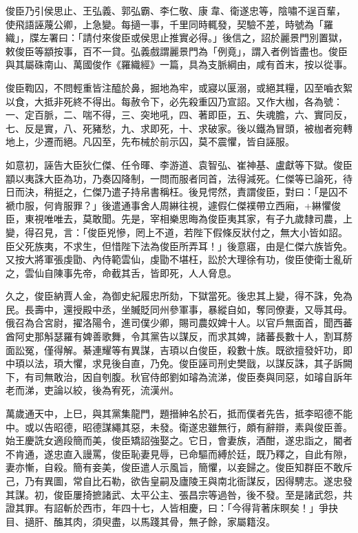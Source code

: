 \begin{pinyinscope}
 俊臣乃引侯思止、王弘義、郭弘霸、李仁敬、康韋、衛遂忠等，陰嘯不逞百輩，使飛語誣蔑公卿，上急變。每擿一事，千里同時輒發，契驗不差，時號為「羅織」，牒左署曰：「請付來俊臣或侯思止推實必得。」後信之，詔於麗景門別置獄，敕俊臣等顓按事，百不一貸。弘義戲謂麗景門為「例竟」，謂入者例皆盡也。俊臣與其屬硃南山、萬國俊作《羅織經》一篇，具為支脈綱由，咸有首末，按以從事。



 俊臣鞫囚，不問輕重皆注醯於鼻，掘地為牢，或寢以匽溺，或絕其糧，囚至嚙衣絮以食，大抵非死終不得出。每赦令下，必先殺重囚乃宣詔。又作大枷，各為號：一、定百脈，二、喘不得，三、突地吼，四、著即臣，五、失魂膽，六、實同反，七、反是實，八、死豬愁，九、求即死，十、求破家。後以鐵為冒頭，被枷者宛轉地上，少遷而絕。凡囚至，先布械於前示囚，莫不震懼，皆自誣服。



 如意初，誣告大臣狄仁傑、任令暉、李游道、袁智弘、崔神基、盧獻等下獄。俊臣顓以夷誅大臣為功，乃奏囚降制，一問而服者同首，法得減死。仁傑等已論死，待日而決，稍挺之，仁傑乃遣子持帛書稱枉。後見愕然，責謂俊臣，對曰：「是囚不褫巾服，何肯服罪？」後遣通事舍人周綝往視，遽假仁傑襆帶立西廂，+綝懼俊臣，東視唯唯去，莫敢聞。先是，宰相樂思晦為俊臣夷其家，有子九歲隸司農，上變，得召見，言：「俊臣兇慘，罔上不道，若陛下假條反狀付之，無大小皆如詔。臣父死族夷，不求生，但惜陛下法為俊臣所弄耳！」後意寤，由是仁傑六族皆免。又按大將軍張虔勖、內侍範雲仙，虔勖不堪枉，訟於大理徐有功，俊臣使衛士亂斫之，雲仙自陳事先帝，命截其舌，皆即死，人人脅息。



 久之，俊臣納賈人金，為御史紀履忠所劾，下獄當死。後忠其上變，得不誅，免為民。長壽中，還授殿中丞，坐贓貶同州參軍事，暴縱自如，奪同僚妻，又辱其母。俄召為合宮尉，擢洛陽令，進司僕少卿，賜司農奴婢十人。以官戶無面首，聞西蕃酋阿史那斛瑟羅有婢善歌舞，令其黨告以謀反，而求其婢，諸蕃長數十人，割耳剺面訟冤，僅得解。綦連耀等有異謀，吉頊以白俊臣，殺數十族。既欲擅發奸功，即中頊以法，頊大懼，求見後自直，乃免。俊臣誣司刑史樊戩，以謀反誅，其子訴闕下，有司無敢治，因自刳腹。秋官侍郎劉如璿為流涕，俊臣奏與同惡，如璿自訴年老而涕，吏論以絞，後為宥死，流漢州。



 萬歲通天中，上巳，與其黨集龍門，題搢紳名於石，抵而僕者先告，抵李昭德不能中。或以告昭德，昭德謀繩其惡，未發。衛遂忠雖無行，頗有辭辯，素與俊臣善。始王慶詵女適段簡而美，俊臣矯詔強娶之。它日，會妻族，酒酣，遂忠詣之，閽者不肯通，遂忠直入謾罵，俊臣恥妻見辱，已命驅而縛於廷，既乃釋之，自此有隙，妻亦慚，自殺。簡有妾美，俊臣遣人示風旨，簡懼，以妾歸之。俊臣知群臣不敢斥己，乃有異圖，常自比石勒，欲告皇嗣及廬陵王與南北衙謀反，因得騁志。遂忠發其謀。初，俊臣屢掎摭諸武、太平公主、張昌宗等過咎，後不發。至是諸武怨，共證其罪。有詔斬於西市，年四十七，人皆相慶，曰：「今得背著床瞑矣！」爭抉目、擿肝、醢其肉，須臾盡，以馬踐其骨，無孑餘，家屬籍沒。




\end{pinyinscope}
